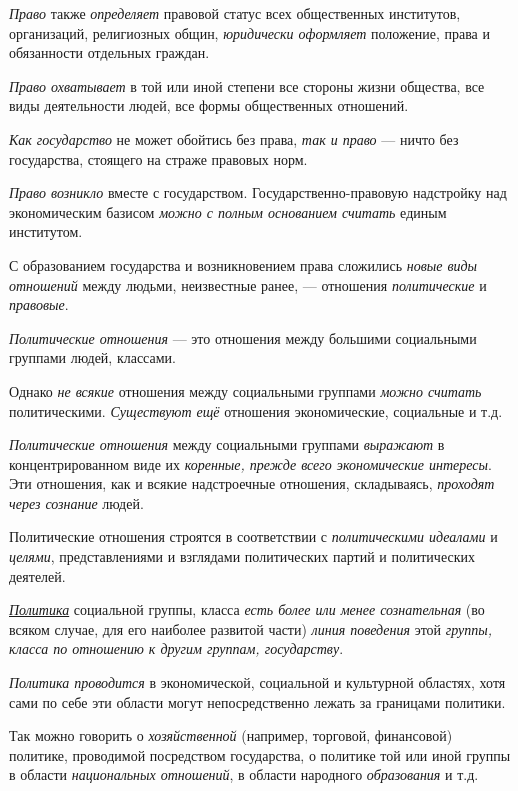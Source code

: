 \documentclass[a4paper,14pt,russian]{extreport}
\begin{document}
\emph{Право} также \emph{определяет} правовой статус всех общественных институтов, организаций, религиозных общин, \emph{юридически оформляет} положение, права и обязанности отдельных граждан.

\emph{Право охватывает} в той или иной степени все стороны жизни общества, все виды деятельности людей, все формы общественных отношений.

\emph{Как государство} не может обойтись без права, \emph{так и право} --- ничто без государства, стоящего на страже правовых норм.

\emph{Право возникло} вместе с государством. Государственно-правовую надстройку над экономическим базисом \emph{можно с полным основанием считать} единым институтом.

С образованием государства и возникновением права сложились \emph{новые виды отношений} между людьми, неизвестные ранее, --- отношения \emph{политические} и \emph{правовые}.

\emph{Политические отношения} --- это отношения между большими социальными группами людей, классами.

Однако \emph{не всякие} отношения между социальными группами \emph{можно считать} политическими. \emph{Существуют ещё} отношения экономические, социальные и т.д.

\emph{Политические отношения} между социальными группами \emph{выражают} в концентрированном виде их \emph{коренные, прежде всего экономические интересы}. Эти отношения, как и всякие надстроечные отношения, складываясь, \emph{проходят через сознание} людей.

Политические отношения строятся в соответствии с \emph{политическими идеалами} и \emph{целями}, представлениями и взглядами политических партий и политических деятелей.

\emph{\underline{Политика}} социальной группы, класса \emph{есть более или менее сознательная} (во всяком случае, для его наиболее развитой части) \emph{линия поведения} этой \emph{группы, класса по отношению к другим группам, государству}.

\emph{Политика проводится} в экономической, социальной и культурной областях, хотя сами по себе эти области могут непосредственно лежать за границами политики.

Так можно говорить о \emph{хозяйственной} (например, торговой, финансовой) политике, проводимой посредством государства, о политике той или иной группы в области \emph{национальных отношений}, в области народного \emph{образования} и т.д.
\end{document}
